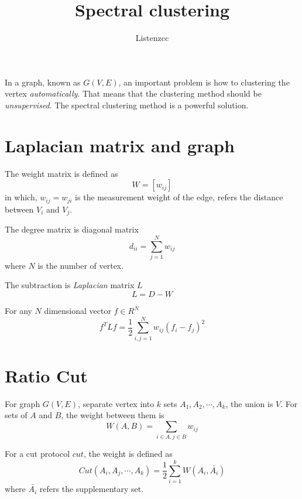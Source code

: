 \documentclass[a4paper]{article}
\begin{document}
\title{Spectral clustering}
\author{Listenzcc}
\maketitle

\abstract
In a graph, known as $G(V, E)$, an important problem is how to clustering the vertex \emph{automatically}.
That means that the clustering method should be \emph{unsupervised}.
The spectral clustering method is a powerful solution.

\section {Laplacian matrix and graph}
The weight matrix is defined as
\begin{equation*}
    W = [w_{ij}]
\end{equation*}
in which, $w_{ij}=w_{ji}$ is the measurement weight of the edge, refers the distance between $V_i$ and $V_j$.

The degree matrix is diagonal matrix
\begin{equation*}
    d_{ii} = \sum_{j=1}^{N}w_{ij}
\end{equation*}
where $N$ is the number of vertex.

The subtraction is \emph{Laplacian} matrix $L$
\begin{equation}
    \label{equation: Laplacian matrix}
    L = D - W
\end{equation}

For any $N$ dimensional vector $f \in R^N$
\begin{equation}
    \label{equation: Laplacian matrix times vector}
    f^T L f = \frac{1}{2} \sum_{i, j=1}^{N} w_{ij}(f_i - f_j)^2
\end{equation}

\section{Ratio Cut}
For graph $G(V, E)$, separate vertex into $k$ sets $A_1, A_2, \cdots , A_k$, the union is $V$.
For sets of $A$ and $B$, the weight between them is
\begin{equation*}
    W(A, B) = \sum_{i \in A, j \in B} w_{ij}
\end{equation*}

For a cut protocol $cut$, the weight is defined as
\begin{equation}
    \label{equation:Loss of cut}
    Cut(A_i, A_j, \cdots, A_k) = \frac{1}{2} \sum_{i=1}^{k} W(A_i, \bar{A_i})
\end{equation}
where $\bar{A_i}$ refers the supplementary set.
\end{document}
